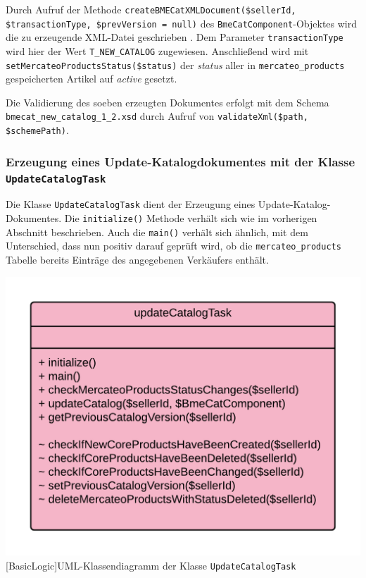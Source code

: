 	Durch Aufruf der Methode \texttt{createBMECatXMLDocument(\$sellerId, \$transactionType, \$prevVersion = null)} des \texttt{BmeCatComponent}-Objektes wird die zu erzeugende XML-Datei geschrieben . Dem Parameter \texttt{transactionType} wird hier der Wert \texttt{T\_NEW\_CATALOG} zugewiesen. Anschließend wird mit \texttt{setMercateoProductsStatus(\$status)} der \textit{status} aller in \texttt{mercateo\_products} gespeicherten Artikel auf \textit{active} gesetzt.

	Die Validierung des soeben erzeugten Dokumentes erfolgt mit dem Schema \texttt{bmecat\_new\_catalog\_1\_2.xsd} durch Aufruf von \texttt{validateXml(\$path, \$schemePath)}.
	
	
	
	\subsubsection{Erzeugung eines Update-Katalogdokumentes  mit der Klasse \texttt{UpdateCatalogTask}}
	
	Die Klasse \texttt{UpdateCatalogTask} dient der Erzeugung eines Update-Katalog-Dokumentes. Die \texttt{initialize()} Methode verhält sich wie im vorherigen Abschnitt beschrieben. Auch die \texttt{main()} verhält sich ähnlich, mit dem Unterschied, dass nun positiv darauf geprüft wird, ob die \texttt{mercateo\_products} Tabelle bereits Einträge des angegebenen Verkäufers enthält. \\
	\begin{minipage}{\linewidth}
		\vspace{1em}
		\centering
		\includegraphics[width=0.7 \linewidth]{img/UpdateCatalogTaskUML}
		[BasicLogic]{UML-Klassendiagramm der Klasse \texttt{UpdateCatalogTask}}
		\vspace{1em}
	\end{minipage}
	
